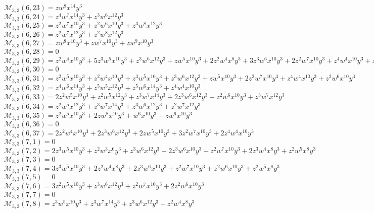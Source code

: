$\mathcal{M}_{3,3}(6,23)=zw^8x^{14}y^3$\\
$\mathcal{M}_{3,3}(6,24)=z^4w^7x^{14}y^3+z^3w^6x^{12}y^3$\\
$\mathcal{M}_{3,3}(6,25)=z^2w^7x^{10}y^3+z^2w^6x^{10}y^3+z^3w^8x^{12}y^3$\\
$\mathcal{M}_{3,3}(6,26)=z^2w^7x^{12}y^3+z^2w^8x^{12}y^3$\\
$\mathcal{M}_{3,3}(6,27)=zw^8x^{10}y^3+zw^7x^{10}y^3+zw^9x^{10}y^3$\\
$\mathcal{M}_{3,3}(6,28)=0$\\
$\mathcal{M}_{3,3}(6,29)=z^2w^4x^{10}y^3+5z^3w^5x^{10}y^3+z^3w^6x^{12}y^3+zw^5x^{10}y^3+2z^2w^4x^8y^3+3z^3w^6x^{10}y^3+2z^2w^7x^{10}y^3+z^4w^4x^{10}y^3+z^2w^5x^8y^3$\\
$\mathcal{M}_{3,3}(6,30)=0$\\
$\mathcal{M}_{3,3}(6,31)=z^2w^5x^{10}y^3+z^2w^4x^{10}y^3+z^3w^5x^{10}y^3+z^3w^6x^{12}y^3+zw^5x^{10}y^3+2z^2w^7x^{10}y^3+z^4w^4x^{10}y^3+z^2w^6x^{10}y^3$\\
$\mathcal{M}_{3,3}(6,32)=z^4w^6x^{14}y^3+z^5w^5x^{12}y^3+z^5w^6x^{14}y^3+z^4w^4x^{10}y^3$\\
$\mathcal{M}_{3,3}(6,33)=2z^2w^5x^{10}y^3+z^2w^5x^{12}y^3+z^3w^7x^{14}y^3+2z^3w^6x^{12}y^3+z^2w^6x^{10}y^3+z^3w^7x^{12}y^3$\\
$\mathcal{M}_{3,3}(6,34)=z^2w^5x^{12}y^3+z^3w^7x^{14}y^3+z^3w^6x^{12}y^3+z^2w^7x^{12}y^3$\\
$\mathcal{M}_{3,3}(6,35)=z^2w^5x^{10}y^3+2zw^8x^{10}y^3+w^6x^{10}y^3+zw^6x^{10}y^3$\\
$\mathcal{M}_{3,3}(6,36)=0$\\
$\mathcal{M}_{3,3}(6,37)=2z^2w^4x^{10}y^3+2z^3w^6x^{12}y^3+2zw^5x^{10}y^3+3z^2w^7x^{10}y^3+2z^4w^4x^{10}y^3$\\
$\mathcal{M}_{3,3}(7,1)=0$\\
$\mathcal{M}_{3,3}(7,2)=2z^3w^5x^{10}y^3+z^2w^3x^6y^3+z^3w^6x^{12}y^3+2z^3w^6x^{10}y^3+z^2w^7x^{10}y^3+2z^3w^4x^8y^3+z^2w^5x^8y^3$\\
$\mathcal{M}_{3,3}(7,3)=0$\\
$\mathcal{M}_{3,3}(7,4)=3z^3w^5x^{10}y^3+2z^2w^4x^8y^3+2z^3w^6x^{10}y^3+z^2w^7x^{10}y^3+z^2w^6x^{10}y^3+z^2w^5x^8y^3$\\
$\mathcal{M}_{3,3}(7,5)=0$\\
$\mathcal{M}_{3,3}(7,6)=3z^2w^5x^{10}y^3+z^3w^6x^{12}y^3+z^2w^7x^{10}y^3+2z^2w^6x^{10}y^3$\\
$\mathcal{M}_{3,3}(7,7)=0$\\
$\mathcal{M}_{3,3}(7,8)=z^3w^5x^{10}y^3+z^3w^7x^{14}y^3+z^3w^6x^{12}y^3+z^2w^4x^8y^3$\\
